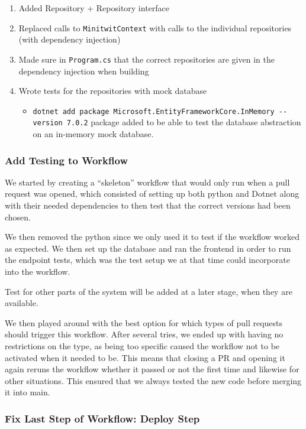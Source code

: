 \begin{enumerate}
    \item Added Repository + Repository interface
    \item Replaced calls to \texttt{MinitwitContext} with calls to the individual repositories (with dependency injection)
    \item Made sure in \texttt{Program.cs} that the correct repositories are given in the dependency injection when building
    \item Wrote tests for the repositories with mock database

    \begin{itemize}
        \item \texttt{dotnet\ add\ package\ Microsoft.EntityFrameworkCore.InMemory\ -\/-version\ 7.0.2} package added to be able to test the database abstraction on an in-memory mock database.
    \end{itemize}
\end{enumerate}

\subsubsection{Add Testing to Workflow}
\label{log:add-testing-to-workflow}

We started by creating a ``skeleton'' workflow that would only run when a pull request was opened, which consisted of setting up both python and Dotnet along with their needed dependencies to then test that the correct versions had been chosen.

We then removed the python since we only used it to test if the workflow worked as expected. We then set up the database and ran the frontend in order to run the endpoint tests, which was the test setup we at that time could incorporate into the workflow.

Test for other parts of the system will be added at a later stage, when they are available.

We then played around with the best option for which types of pull requests should trigger this workflow. After several tries, we ended up with having no restrictions on the type, as being too specific caused the workflow not to be activated when it needed to be. This means that closing a PR and opening it again reruns the workflow whether it passed or not the first time and likewise for other situations. This ensured that we always tested the new code before merging it into main.

\subsubsection{Fix Last Step of Workflow: Deploy Step}
\label{log:fix-last-step-of-workflow-deploy-step}

